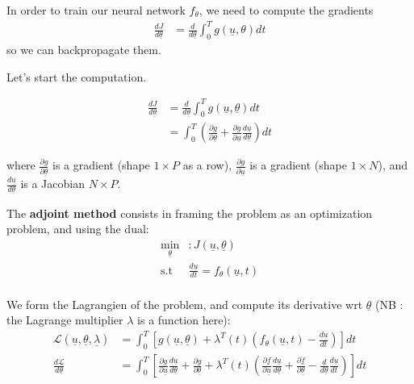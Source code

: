    In order to train our neural network $f_{\theta}$, we need to compute the gradients
    \begin{align}
        \frac{dJ}{d \underline{\theta}} &= \frac{d}{d \underline{\theta}} \int_{0}^{T} g(\underline{u}, \theta) dt 
    \end{align}
    so we can backpropagate them.

    Let's start the computation.

    \begin{align}
        \frac{dJ}{d \underline{\theta}} &= \frac{d}{d \underline{\theta}} \int_{0}^{T} g(\underline{u}, \underline{\theta}) dt \\
        &= \int_{0}^{T} \left( \frac{\partial g}{\partial \underline{\theta}} + \frac{\partial g}{\partial \underline{u}} 
        \frac{d \underline{u}}{d \underline{\theta}} \right) dt
    \end{align}

    where $\frac{\partial g}{\partial \underline{\theta}}$ is a gradient (shape $1 \times P$ as a row), $\frac{\partial g}{\partial \underline{u}}$ 
    is a gradient (shape $1 \times N$), and $\frac{d \underline{u}}{d \underline{\theta}}$ is a Jacobian $N \times P$.

    The \textbf{adjoint method} consists in framing the problem as an optimization problem, and using the dual:
    \begin{align}
        \underset{\underline{\theta}}{\text{min}} &: {J(\underline{u}, \underline{\theta})} \\
        \text{s.t} \,\,\,  &\frac{d \underline{u}}{dt} = f_{\theta}(\underline{u},t) \\
    \end{align}

    We form the Lagrangien of the problem, and compute its derivative wrt $\underline{\theta}$ (NB : the 
    Lagrange multiplier $\lambda$ is a function here):
    \begin{align}
        \mathcal{L}(\underline{u}, \underline{\theta}, \underline{\lambda} ) &= \int_{0}^{T} \left[ g(\underline{u}, \underline{\theta})
            + \lambda^{T}(t) \left( f_{\theta}(\underline{u},t) - \frac{d \underline{u}}{dt} \right) \right] dt \\
        \frac{d \mathcal{L}}{d \underline{\theta}} &= \int_{0}^{T} \left[ \frac{\partial g}{\partial \underline{u}} \frac{d \underline{u}}{d \underline{\theta}}
        + \frac{\partial g}{\partial \underline{\theta}} + \lambda^{T}(t) \left( \frac{\partial \underline{f}}{\partial \underline{u}} \frac{d \underline{u}}{d \underline{\theta}}
        + \frac{\partial \underline{f}}{\partial \underline{\theta}} -\frac{d}{d \underline{\theta}} \frac{d \underline{u}}{dt} \right) \right] dt
    \end{align} 


